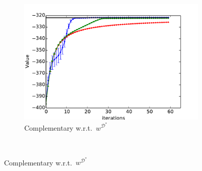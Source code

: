 \documentclass{aamas2016}
\begin{document}
\begin{figure}[t]
    \begin{subfigure}[t]{0.55\columnwidth}
    \includegraphics[trim=0.6cm 0.0cm 0.0cm 0.0cm,clip=true,width=1.45\textwidth]{images/expert_apprentice_complementary.pdf}
    \caption{Complementary w.r.t.\ $w^{\mathcal{D}^*}$}
    \label{fig:toy_expert_apprentice_complementary}
    \end{subfigure}
    \\


\end{figure}
\end{document}
